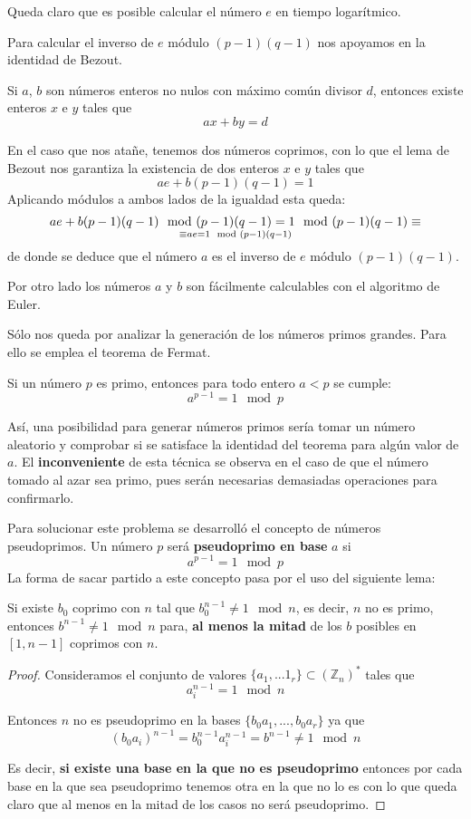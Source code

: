 \documentclass[nochap]{apuntesURJC}
\begin{document}
Queda claro que es posible calcular el número $e$ en tiempo logarítmico.

Para calcular el inverso de $e$ módulo $(p-1)(q-1)$ nos apoyamos en la identidad de Bezout.
\begin{lemma}
Si $a$, $b$ son números enteros no nulos con máximo común divisor $d$, entonces existe enteros $x$ e $y$ tales que
\[ax+by=d\]
\end{lemma}

En el caso que nos atañe, tenemos dos números coprimos, con lo que el lema de Bezout nos garantiza la existencia de dos enteros $x$ e $y$ tales que
\[ae + b(p-1)(q-1)=1\]
Aplicando módulos a ambos lados de la igualdad esta queda:
\[ae + b(p-1)(q-1) \mod (p-1)(q-1) = 1 \mod (p-1)(q-1) \equiv\atop \equiv ae = 1 \mod (p-1)(q-1)\]
de donde se deduce que el número $a$ es el inverso de $e$ módulo $(p-1)(q-1)$.

Por otro lado los números $a$ y $b$ son fácilmente calculables con el algoritmo de Euler.

Sólo nos queda por analizar la generación de los números primos grandes. Para ello se emplea el teorema de Fermat.
\begin{theorem}
Si un número $p$ es primo, entonces para todo entero $a < p$ se cumple:
\[a^{p-1}=1 \mod p\]
\end{theorem}

Así, una posibilidad para generar números primos sería tomar un número aleatorio y comprobar si se satisface la identidad del teorema para algún valor de $a$. El \textbf{inconveniente} de esta técnica se observa en el caso de que el número tomado al azar sea primo, pues serán necesarias demasiadas operaciones para confirmarlo.

Para solucionar este problema se desarrolló el concepto de números pseudoprimos. Un número $p$ será \textbf{pseudoprimo en base} $a$ si
\[a^{p-1}=1 \mod p\]
La forma de sacar partido a este concepto pasa por el uso del siguiente lema:
\begin{lemma}\label{lemma:pseudoprimo}
Si existe $b_0$ coprimo con $n$ tal que $b_0^{n-1}\neq 1 \mod n$, es decir, $n$ no es primo, entonces $b^{n-1} \neq 1 \mod n$ para, \textbf{al menos la mitad} de los $b$ posibles en $[1,n-1]$ coprimos con $n$.
\end{lemma}
\begin{proof}
Consideramos el conjunto de valores $\{a_1,...1_r\} \subset \left(\mathbb{Z}_n\right)^*$ tales que
\[a_i^{n-1} = 1 \mod n\]

Entonces $n$ no es pseudoprimo en la bases $\{b_0a_1,...,b_0a_r\}$ ya que
\[(b_0a_i)^{n-1} = b_0^{n-1}a_i^{n-1} = b^{n-1} \neq 1 \mod n\]

Es decir, \textbf{si existe una base en la que no es pseudoprimo} entonces por cada base en la que sea pseudoprimo tenemos otra en la que no lo es con lo que queda claro que al menos en la mitad de los casos no será pseudoprimo.
\end{proof}
\end{document}
